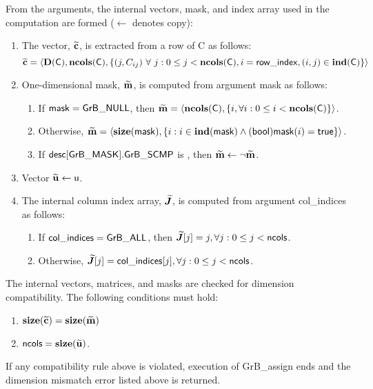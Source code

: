From the arguments, the internal vectors, mask, and index array used in 
the computation are formed ($\leftarrow$ denotes copy):
\begin{enumerate}
	\item The vector, ${\bf \widetilde{c}}$, is extracted from a row of {\sf C}
    as follows:
    \[
        {\bf \widetilde{c}} = \langle  \bold{D}({\sf C}), \bold{ncols}({\sf C}), 
        \{ (j, C_{ij}) \ \forall \ j : 0 \leq j < \bold{ncols}({\sf C}),
        i = {\sf row\_index}, (i, j) \in \bold{ind}({\sf C})\} \rangle
    \]

	\item One-dimensional mask, ${\bf \widetilde{m}}$, is computed from 
    argument {\sf mask} as follows:
	\begin{enumerate}
		\item	If ${\sf mask} = {\sf GrB\_NULL}$, then ${\bf \widetilde{m}} = 
        \langle \bold{ncols}({\sf C}), \{i, \forall i : 0 \leq i < 
        \bold{ncols}({\sf C}) \} \rangle$.

		\item	Otherwise, ${\bf \widetilde{m}} = 
        \langle \bold{size}({\sf mask}), \{i : i \in \bold{ind}({\sf mask}) \wedge
        ({\sf bool}){\sf mask}(i) = {\sf true} \} \rangle$.

		\item	If ${\sf desc[GrB\_MASK].GrB\_SCMP}$ is \true, then 
        ${\bf \widetilde{m}} \leftarrow \neg {\bf \widetilde{m}}$.
	\end{enumerate}

	\item Vector ${\bf \widetilde{u}} \leftarrow {\sf u}$.
    
    \item The internal column index array, $\bm{\widetilde{J}}$, is computed from 
    argument {\sf col\_indices} as follows:
	\begin{enumerate}
		\item	If ${\sf col\_indices} = {\sf GrB\_ALL}$, then 
        $\bm{\widetilde{J}}[j] = j, \forall j : 0 \leq j < {\sf ncols}$.

		\item	Otherwise, $\bm{\widetilde{J}}[j] = {\sf col\_indices}[j], 
        \forall j : 0 \leq j < {\sf ncols}$.
    \end{enumerate}
\end{enumerate}

The internal vectors, matrices, and masks are checked for dimension compatibility. 
The following conditions must hold:
\begin{enumerate}
	\item $\bold{size}({\bf \widetilde{c}}) = \bold{size}({\bf \widetilde{m}})$
    \item ${\sf ncols} = \bold{size}({\bf \widetilde{u}})$.
\end{enumerate}
If any compatibility rule above is violated, execution of {\sf GrB\_assign} ends and 
the dimension mismatch error listed above is returned.

